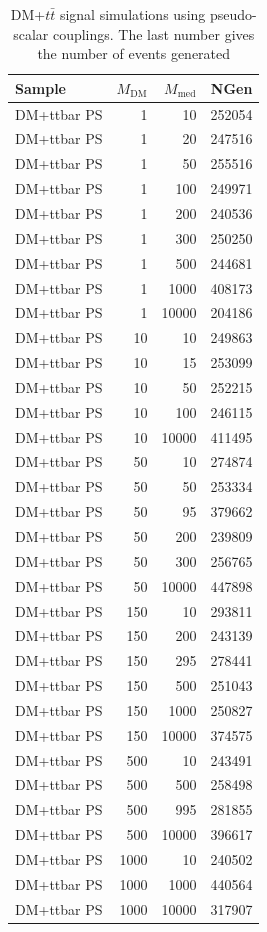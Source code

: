 \begin{table}[]
\centering
\begin{tabular}{lrrr}
\hline \hline
Sample & $M_{\text{DM}}$ & $M_{\text{med}}$ & NGen \\
\hline
DM+ttbar PS & 1    & 10    & 252054 \\
DM+ttbar PS & 1    & 20    & 247516 \\
DM+ttbar PS & 1    & 50    & 255516 \\
DM+ttbar PS & 1    & 100   & 249971 \\
DM+ttbar PS & 1    & 200   & 240536 \\
DM+ttbar PS & 1    & 300   & 250250 \\
DM+ttbar PS & 1    & 500   & 244681 \\
DM+ttbar PS & 1    & 1000  & 408173 \\
DM+ttbar PS & 1    & 10000 & 204186 \\
DM+ttbar PS & 10   & 10    & 249863 \\
DM+ttbar PS & 10   & 15    & 253099 \\
DM+ttbar PS & 10   & 50    & 252215 \\
DM+ttbar PS & 10   & 100   & 246115 \\
DM+ttbar PS & 10   & 10000 & 411495 \\
DM+ttbar PS & 50   & 10    & 274874 \\
DM+ttbar PS & 50   & 50    & 253334 \\
DM+ttbar PS & 50   & 95    & 379662 \\
DM+ttbar PS & 50   & 200   & 239809 \\
DM+ttbar PS & 50   & 300   & 256765 \\
DM+ttbar PS & 50   & 10000 & 447898 \\
DM+ttbar PS & 150  & 10    & 293811 \\
DM+ttbar PS & 150  & 200   & 243139 \\
DM+ttbar PS & 150  & 295   & 278441 \\
DM+ttbar PS & 150  & 500   & 251043 \\
DM+ttbar PS & 150  & 1000  & 250827 \\
DM+ttbar PS & 150  & 10000 & 374575 \\
DM+ttbar PS & 500  & 10    & 243491 \\
DM+ttbar PS & 500  & 500   & 258498 \\
DM+ttbar PS & 500  & 995   & 281855 \\
DM+ttbar PS & 500  & 10000 & 396617 \\
DM+ttbar PS & 1000 & 10    & 240502 \\
DM+ttbar PS & 1000 & 1000  & 440564 \\
DM+ttbar PS & 1000 & 10000 & 317907 \\
\hline \hline
\end{tabular}
\caption{DM+$t\bar{t}$ signal simulations using pseudo-scalar couplings. The last number gives the number of events generated}
\label{tab:dmtt_ps}
\end{table}

